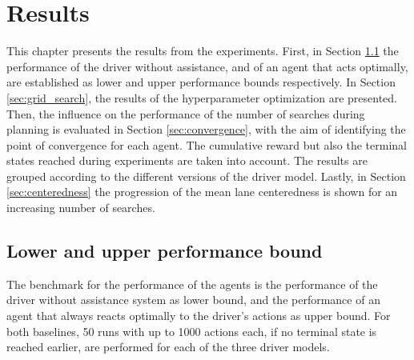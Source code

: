 \chapter{Results}
\label{ch:results}

This chapter presents the results from the experiments. First, in Section \ref{sec:perf_bounds} the performance of the driver without assistance, and of an agent that acts optimally, are established as lower and upper performance bounds respectively. In Section \ref{sec:grid_search}, the results of the hyperparameter optimization are presented. Then, the influence on the performance of the number of searches during planning is evaluated in Section \ref{sec:convergence}, with the aim of identifying the point of convergence for each agent. The cumulative reward but also the terminal states reached during experiments are taken into account. The results are grouped according to the different versions of the driver model. Lastly, in Section \ref{sec:centeredness} the progression of the mean lane centeredness is shown for an increasing number of searches.




\section{Lower and upper performance bound}
\label{sec:perf_bounds}


The benchmark for the performance of the agents is the performance of the driver without assistance system as lower bound, and the performance of an agent that always reacts optimally to the driver's actions as upper bound. For both baselines, 50 runs with up to 1000 actions each, if no terminal state is reached earlier, are performed for each of the three driver models. 

